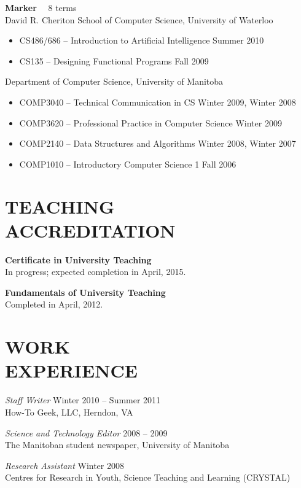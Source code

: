 \documentclass[line,margin]{res}
\begin{document}
\begin{resume}
{\bf Marker} ~~8 terms \vspace{4pt} \\
David R. Cheriton School of Computer Science, University of Waterloo
\begin{itemize}  \itemsep -2pt
  \item CS486/686 -- Introduction to Artificial Intelligence \hfill Summer 2010
  \item CS135 -- Designing Functional Programs \hfill Fall 2009
\end{itemize} \vspace{-4pt}
Department of Computer Science, University of Manitoba
\begin{itemize}  \itemsep -2pt
  \item COMP3040 -- Technical Communication in CS \hfill Winter 2009, Winter 2008
  \item COMP3620 -- Professional Practice in Computer Science \hfill Winter 2009
  \item COMP2140 -- Data Structures and Algorithms \hfill Winter 2008, Winter 2007
  \item COMP1010 -- Introductory Computer Science 1 \hfill Fall 2006
\end{itemize}

\section{TEACHING \\ACCREDITATION}

{\bf Certificate in University Teaching} \\
In progress; expected completion in April, 2015.

{\bf Fundamentals of University Teaching} \\
Completed in April, 2012.

\section{WORK \\EXPERIENCE}

{\sl Staff Writer} \hfill Winter 2010 -- Summer 2011 \\
How-To Geek, LLC, Herndon, VA

{\sl Science and Technology Editor} \hfill 2008 -- 2009 \\
The Manitoban student newspaper, University of Manitoba

{\sl Research Assistant} \hfill Winter 2008 \\
Centres for Research in Youth, Science Teaching and Learning (CRYSTAL)


\end{resume}
\end{document}
